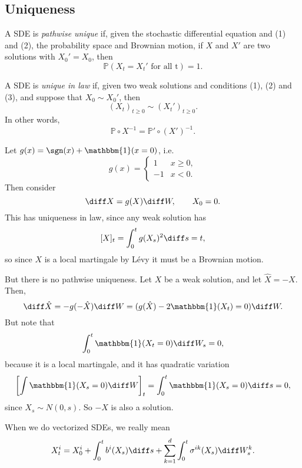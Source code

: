 \documentclass[12pt]{article}
\begin{document}
\subsection{Uniqueness}%
\label{sub:unq}

\begin{definition}
	A SDE is \emph{pathwise unique} if, given the stochastic differential equation and (1) and (2), the probability space and Brownian motion, if $X$ and $X'$ are two solutions with $X_0' = X_0$, then
	\[
		\mathbb{P}(X_t = X_t' \text{ for all t}) = 1.
	\]
\end{definition}

\begin{definition}
	A SDE is \emph{unique in law} if, given two weak solutions and conditions (1), (2) and (3), and suppose that $X_0 \sim X_0'$, then
	\[
		(X_t)_{t \geq 0} \sim (X_t')_{t \geq 0}.
	\]
	In other words,
	\[
	\mathbb{P} \circ X^{-1} = \mathbb{P}' \circ (X')^{-1}.
	\]
\end{definition}


\begin{exbox}
	Let $g(x) = \sgn(x) + \mathbbm{1}(x = 0)$, i.e.
	\[
	g(x) =
	\begin{cases}
		1 & x \geq 0, \\
		-1 & x < 0.
	\end{cases}
	\]
	Then consider
	\[
	\diff X = g(X) \diff W, \qquad X_0 = 0.
	\]
	This has uniqueness in law, since any weak solution has
	\[
		[X]_t = \int_0^{t} g(X_s)^2 \diff s = t,
	\]
	so since $X$ is a local martingale by L\'evy it must be a Brownian motion.

	But there is no pathwise uniqueness. Let $X$ be a weak solution, and let $\hat X = -X$. Then,
	\[
	\diff \hat X = - g(- \hat X) \diff W = (g(\hat X) - 2 \mathbbm{1}(X_t) = 0) \diff W.
	\]
	But note that
	\[
	\int_0^{t} \mathbbm{1}(X_t = 0) \diff W_s = 0,
	\]
	because it is a local martingale, and it has quadratic variation
	\[
		\left[ \int \mathbbm{1}(X_s = 0) \diff W \right]_t = \int_0^{t} \mathbbm{1}(X_s = 0) \diff s = 0,
	\]
	since $X_s \sim N(0, s)$. So $-X$ is also a solution.
\end{exbox}

When we do vectorized SDEs, we really mean
\[
X_t^{i} = X_0^{i} + \int_0^{t} b^i (X_s) \diff s + \sum_{k = 1}^{d} \int_0^{t} \sigma^{ik} (X_s) \diff W^k_s.
\]
\end{document}
